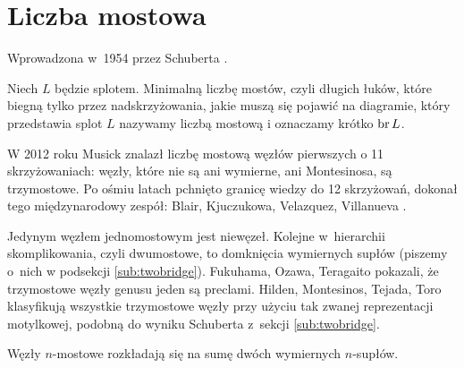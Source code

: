 
\section{Liczba mostowa}
%

Wprowadzona w~1954 przez Schuberta \cite{schubert1954}.
%

\begin{definition}
    Niech $L$ będzie splotem.
    Minimalną liczbę mostów, czyli długich łuków, które biegną tylko przez nadskrzyżowania, jakie muszą się pojawić na diagramie, który przedstawia splot $L$ nazywamy liczbą mostową i oznaczamy krótko $\operatorname{br} L$.
\end{definition}

W 2012 roku Musick \cite{musick2012} znalazł liczbę mostową węzłów pierwszych o 11 skrzyżowaniach: węzły, które nie są ani wymierne, ani Montesinosa, są trzymostowe.
%
Po ośmiu latach pchnięto granicę wiedzy do 12 skrzyżowań, dokonał tego międzynarodowy zespół: Blair, Kjuczukowa, Velazquez, Villanueva \cite{blair2020}.
%
%
%
%

Jedynym węzłem jednomostowym jest niewęzeł.
Kolejne w~hierarchii skomplikowania, czyli dwumostowe, to domknięcia wymiernych supłów (piszemy o~nich w podsekcji \ref{sub:twobridge}).
Fukuhama, Ozawa, Teragaito \cite{fukuhama1999} pokazali, że trzymostowe węzły genusu jeden są preclami.
%
%
%
%
%
%
Hilden, Montesinos, Tejada, Toro \cite{hilden2012} klasyfikują wszystkie trzymostowe węzły przy użyciu tak zwanej reprezentacji motylkowej, podobną do wyniku Schuberta z~sekcji \ref{sub:twobridge}.
%
%
%
%
%
%
%

\begin{proposition}
    Węzły $n$-mostowe rozkładają się na sumę dwóch wymiernych $n$-supłów.
\end{proposition}
%

